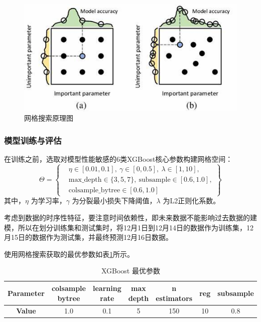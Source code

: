 \documentclass{MMCStyle}
\begin{document}
\begin{figure}[htb]
	\centering
	\includegraphics[width=0.8\linewidth]{GridSearch.jpg}
	\caption{网格搜索原理图}
	\label{fig:5}
\end{figure}

\subsubsection{模型训练与评估}
   在训练之前，选取对模型性能敏感的6类XGBoost核心参数构建网格空间：
    \begin{equation}
    \Theta = \left\{ 
       \begin{aligned}
       & \eta \in [0.01, 0.1], \ 
       \gamma \in [0, 0.5], \ 
       \lambda \in [1, 10], \\
       & \text{max\_depth} \in \{3, 5, 7\}, \ 
       \text{subsample} \in [0.6, 1.0], \\
       & \text{colsample\_bytree} \in [0.6, 1.0]
       \end{aligned} 
    \right\}
    \end{equation}
   其中，\(\eta\) 为学习率，\(\gamma\) 为分裂最小损失下降阈值，\(\lambda\) 为L2正则化系数。

考虑到数据的时序性特征，要注意时间依赖性，即未来数据不能影响过去数据的建模，所以在划分训练集和测试集时，将12月1日到12月14日的数据作为训练集，12月15日的数据作为测试集，并最终预测12月16日数据。

使用网格搜索获取的最优参数如表\ref{tab:5}所示。

\begin{table}[h]
\centering
\caption{XGBoost 最优参数}
\label{tab:5}
\begin{tabular}{|c|c|c|c|c|c|c|}
\hline
\textbf{Parameter} & colsample bytree & learning rate & max depth & n estimators & reg & subsample \\ \hline
\textbf{Value} & 1.0 & 0.1 & 5 & 150 & 10 & 0.8 \\ \hline
\end{tabular}
\end{table}
\end{document}
